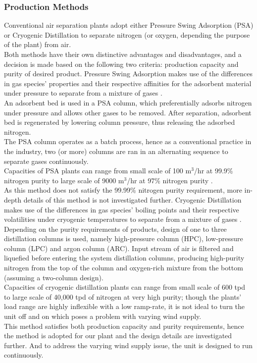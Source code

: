 	\subsubsection{Production Methods} \noindent
    Conventional air separation plants adopt either Pressure Swing Adsorption (PSA) or Cryogenic Distillation to separate nitrogen (or oxygen, depending the purpose of the plant) from air. \\
    Both methods have their own distinctive advantages and disadvantages, and a decision  is made based on the following two criteria: production capacity and purity of desired product.  
        Pressure Swing Adsorption makes use of the differences in gas species' properties and their respective affinities for the adsorbent material under pressure to separate from a mixture of gases \citep{linde_PSA}. \\
        An adsorbent bed is used in a PSA column, which preferentially adsorbs nitrogen under pressure and allows other gases to be removed. After separation, adsorbent bed is regenerated by lowering column pressure, thus releasing the adsorbed nitrogen.\\
        The PSA column operates as a batch process, hence as a conventional practice in the industry, two  (or more) columns are ran in an alternating sequence to separate gases continuously.\\
        Capacities of PSA plants can range from small scale of 100 m$^3$/hr at 99.9\% nitrogen purity to large scale of 9000 m$^3$/hr at 97\% nitrogen purity \citep{PRISM}. \\
        As this method does not satisfy the 99.99\% nitrogen purity requirement, more in-depth details of this method is not investigated further.
        Cryogenic Distillation makes use of the differences in gas species' boiling points and their respective volatilities under cryogenic temperatures to separate from a mixture of gases \citep{linde_cryo}.\\
        Depending on the purity requirements of products, design of one to three distillation columns is used, namely high-pressure column (HPC), low-pressure column (LPC) and argon column (ARC). Input stream of air is filtered and liquefied before entering the system distillation columns, producing high-purity nitrogen from the top of the column and oxygen-rich mixture from the bottom (assuming a two-column design).\\
        Capacities of cryogenic distillation plants can range from small scale of 600 tpd to large scale of 40,000 tpd of nitrogen at very high purity; though the plants' load range are highly inflexible with a low ramp-rate, it is not ideal to turn the unit off and on which poses a problem with varying wind supply. \\
        This method satisfies both production capacity and purity requirements, hence the method is adopted for our plant and the design details are investigated further. And to address the varying wind supply issue, the unit is designed to run continuously.
